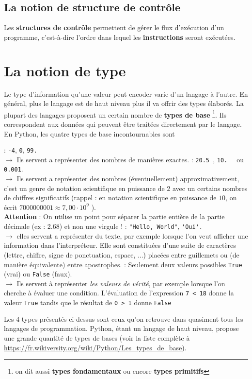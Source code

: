 \documentclass[11pt, a4paper]{book}
\begin{document}
\subsection{La notion de structure de contrôle}
Les \textbf{structures de contrôle} permettent de gérer le flux d'exécution d'un programme, c'est-à-dire l'ordre dans lequel les \textbf{instructions} seront exécutées. 


\section{La notion de type}
Le type d'information qu'une valeur peut encoder varie d'un langage à l'autre. En général, plus le langage est de haut niveau plus il va offrir des types élaborés. La plupart des langages proposent un certain nombre de \textbf{types de base} \footnote{on dit aussi \textbf{types fondamentaux} ou encore \textbf{types primitifs}}. Ils correspondent aux données qui peuvent être traitées directement par le langage. En Python, les quatre types de base incontournables sont
\begin{enumerate}
	:  \lstinline{-4}, \lstinline{0}, \lstinline{99.}\\
	$ \longrightarrow$ Ils servent a représenter des nombres de manières exactes.
	 : \lstinline{20.5 },  \lstinline{10.  } ou \lstinline{ 0.001}.\\
	$ \longrightarrow$ Ils servent a représenter des nombres (éventuellement) approximativement, c’est un genre de notation scientifique en puissance de 2 avec un certains nombres de chiffres significatifs (rappel : en notation scientifique en puissance de $10$, on écrit $7000000001 \approx 7,00 \cdot 10^9$ ).\\
	\textbf{Attention} : On utilise un point pour séparer la partie entière de la partie décimale (ex : 2.68) et non une virgule !
	: \lstinline{"Hello, World"}, \lstinline{'Oui'.}\\
	$ \longrightarrow$ elles servent a représenter du texte, par exemple lorsque l’on veut afficher une information dans l’interpréteur. Elle sont constituées d'une suite de caractères
	(lettre, chiffre, signe de ponctuation, espace, ...) placées entre guillemets ou (de manière équivalente) entre apostrophes.
	: Seulement deux valeurs possibles \lstinline{True} (vrai) ou \lstinline{False} (faux).\\
	$ \longrightarrow$ Ils servent à représenter \textit{les valeurs de vérité}, par exemple lorsque l'on cherche à évaluer une condition. L'évaluation de l'expression \lstinline{7 < 18} donne la valeur \lstinline{True} tandis que le résultat de \lstinline{0 > 1} donne \lstinline{False}
\end{enumerate}
Les 4 types présentés ci-dessus sont ceux qu'on retrouve dans quasiment tous les langages de programmation. Python, étant un langage de haut niveau, propose une grande quantité de types de bases (voir la liste complète à \url{https://fr.wikiversity.org/wiki/Python/Les_types_de_base}).
\end{document}
